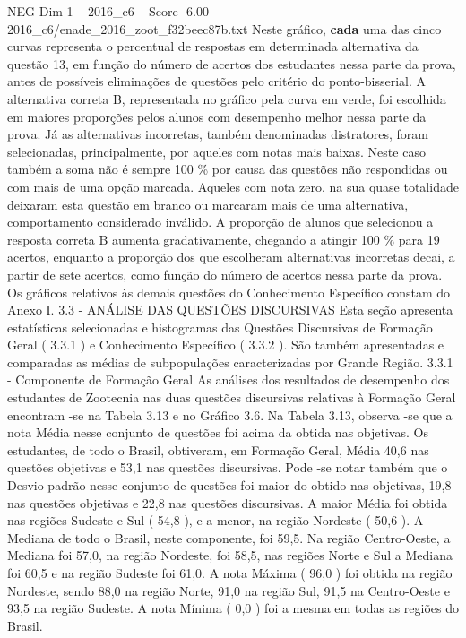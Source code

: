 \begin{textsample}{NEG Dim 1 – 2016\_c6 – Score -6.00 – 2016\_c6/enade\_2016\_zoot\_f32beec87b.txt}
Neste gráfico, \textbf{cada} uma das cinco curvas representa o percentual de respostas em determinada alternativa da questão 13, em função do número de acertos dos estudantes nessa parte da prova, antes de possíveis eliminações de questões pelo critério do ponto-bisserial.
A alternativa correta B, representada no gráfico pela curva em verde, foi escolhida em maiores proporções pelos alunos com desempenho melhor nessa parte da prova.
Já as alternativas incorretas, também denominadas distratores, foram selecionadas, principalmente, por aqueles com notas mais baixas.
Neste caso também a soma não é sempre 100 \% por causa das questões não respondidas ou com mais de uma opção marcada.
Aqueles com nota zero, na sua quase totalidade deixaram esta questão em branco ou marcaram mais de uma alternativa, comportamento considerado inválido.
A proporção de alunos que selecionou a resposta correta B aumenta gradativamente, chegando a atingir 100 \% para 19 acertos, enquanto a proporção dos que escolheram alternativas incorretas decai, a partir de sete acertos, como função do número de acertos nessa parte da prova.
Os gráficos relativos às demais questões do Conhecimento Específico constam do Anexo I. 3.3 - ANÁLISE DAS QUESTÕES DISCURSIVAS Esta seção apresenta estatísticas selecionadas e histogramas das Questões Discursivas de Formação Geral ( 3.3.1 ) e Conhecimento Específico ( 3.3.2 ).
São também apresentadas e comparadas as médias de subpopulações caracterizadas por Grande Região. 3.3.1 - Componente de Formação Geral As análises dos resultados de desempenho dos estudantes de Zootecnia nas duas questões discursivas relativas à Formação Geral encontram -se na Tabela 3.13 e no Gráfico 3.6.
Na Tabela 3.13, observa -se que a nota Média nesse conjunto de questões foi acima da obtida nas objetivas.
Os estudantes, de todo o Brasil, obtiveram, em Formação Geral, Média 40,6 nas questões objetivas e 53,1 nas questões discursivas.
Pode -se notar também que o Desvio padrão nesse conjunto de questões foi maior do obtido nas objetivas, 19,8 nas questões objetivas e 22,8 nas questões discursivas.
A maior Média foi obtida nas regiões Sudeste e Sul ( 54,8 ), e a menor, na região Nordeste ( 50,6 ).
A Mediana de todo o Brasil, neste componente, foi 59,5.
Na região Centro-Oeste, a Mediana foi 57,0, na região Nordeste, foi 58,5, nas regiões Norte e Sul a Mediana foi 60,5 e na região Sudeste foi 61,0.
A nota Máxima ( 96,0 ) foi obtida na região Nordeste, sendo 88,0 na região Norte, 91,0 na região Sul, 91,5 na Centro-Oeste e 93,5 na região Sudeste.
A nota Mínima ( 0,0 ) foi a mesma em todas as regiões do Brasil.

\end{textsample}
